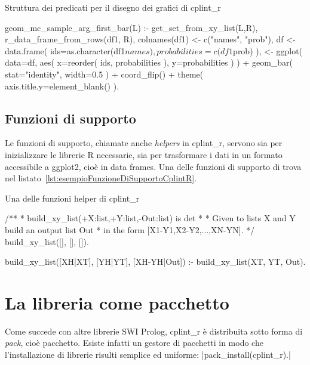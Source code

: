 \documentclass[10pt,titlepage,twoside,a4paper]{report}
\newenvironment{code}{\singlespacing\captionsetup{type=listing}}{}
\begin{document}
\begin{code}
    \caption{Struttura dei predicati per il disegno dei grafici di cplint\_r}
    \label{lst:esempioPredicatoGeomCplintR}
    \begin{prologcode*}{}
geom_mc_sample_arg_first_bar(L) :-
    get_set_from_xy_list(L,R),
    r_data_frame_from_rows(df1, R),
    colnames(df1) <- c("names", "prob"),
    df <- data.frame(
        ids=as.character(df1$names),
        probabilities=c(df1$prob)
    ),
    <- ggplot(
        data=df,
        aes(
            x=reorder(
                ids,
                probabilities
            ),
            y=probabilities
        )
    ) + geom_bar(
        stat="identity",
        width=0.5
    )
    + coord_flip() + theme(
        axis.title.y=element_blank()
    ).
\end{prologcode*}
\end{code}

\subsection{Funzioni di supporto}
Le funzioni di supporto, chiamate anche \emph{helpers} in cplint\_r, servono 
sia per inizializzare le librerie R necessarie, sia per trasformare i dati in 
un formato accessibile a ggplot2, cioè in data frames. Una delle funzioni di
supporto di trova nel listato~\ref{lst:esempioFunzioneDiSupportoCplintR}.

\begin{code}
    \caption{Una delle funzioni helper di cplint\_r}
    \label{lst:esempioFunzioneDiSupportoCplintR}
    \begin{prologcode*}{}
/**
 * build_xy_list(+X:list,+Y:list,-Out:list) is det
 *
 * Given to lists X and Y build an output list Out
 * in the form [X1-Y1,X2-Y2,...,XN-YN].
 */
build_xy_list([], [], []).

build_xy_list([XH|XT], [YH|YT], [XH-YH|Out]) :-
        build_xy_list(XT, YT, Out).
    \end{prologcode*}
\end{code}


\section{La libreria come pacchetto}
Come succede con altre librerie SWI Prolog, cplint\_r è distribuita sotto 
forma di \emph{pack}, cioè pacchetto. Esiste infatti un gestore di pacchetti 
in modo che l'installazione di librerie risulti semplice ed uniforme: 
|pack_install(cplint_r).|
\end{document}
